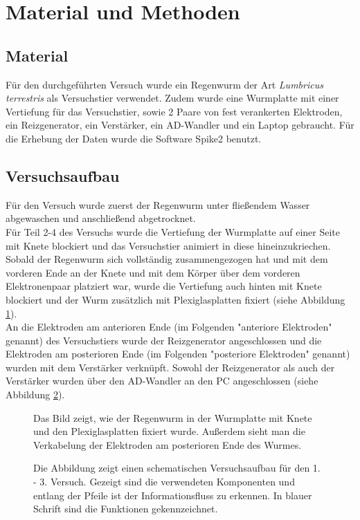 \documentclass[11pt]{article}
\begin{document}
\section{Material und Methoden}
\subsection{Material}
Für den durchgeführten Versuch wurde ein Regenwurm der Art \textit{Lumbricus terrestris} als Versuchstier verwendet. Zudem wurde eine Wurmplatte mit einer Vertiefung für das Versuchstier, sowie 2 Paare von fest verankerten Elektroden, ein Reizgenerator, ein Verstärker, ein AD-Wandler und ein Laptop gebraucht. Für die Erhebung der Daten wurde die Software Spike2 benutzt.
\subsection{Versuchsaufbau}
Für den Versuch wurde zuerst der Regenwurm unter fließendem Wasser abgewaschen und anschließend abgetrocknet.\\
Für Teil 2-4 des Versuchs wurde die Vertiefung der Wurmplatte auf einer Seite mit Knete blockiert und das Versuchstier animiert in diese hineinzukriechen. Sobald der Regenwurm sich vollständig zusammengezogen hat und mit dem vorderen Ende an der Knete und mit dem Körper über dem vorderen Elektronenpaar platziert war, wurde die Vertiefung auch hinten mit Knete blockiert und der Wurm zusätzlich mit Plexiglasplatten fixiert (siehe Abbildung \ref{foto}). \\
An die Elektroden am anterioren Ende (im Folgenden "{}anteriore Elektroden"{} genannt) des Versuchstiers wurde der Reizgenerator angeschlossen und die Elektroden am posterioren Ende (im Folgenden "{}posteriore Elektroden"{} genannt) wurden mit dem Verstärker verknüpft. Sowohl der Reizgenerator als auch der Verstärker wurden über den AD-Wandler an den PC angeschlossen (siehe Abbildung \ref{schema}).
\begin{figure}[H]
\caption{Das Bild zeigt, wie der Regenwurm in der Wurmplatte mit Knete und den Plexiglasplatten fixiert wurde. Außerdem sieht man die Verkabelung der Elektroden am posterioren Ende des Wurmes. }
\label{foto}
\end{figure}
\begin{figure}[H]
\caption{Die Abbildung zeigt einen schematischen Versuchsaufbau für den 1. - 3. Versuch. Gezeigt sind die verwendeten Komponenten und entlang der Pfeile ist der Informationsfluss zu erkennen. In blauer Schrift sind die Funktionen gekennzeichnet. }
\label{schema}
\end{figure}
\end{document}
